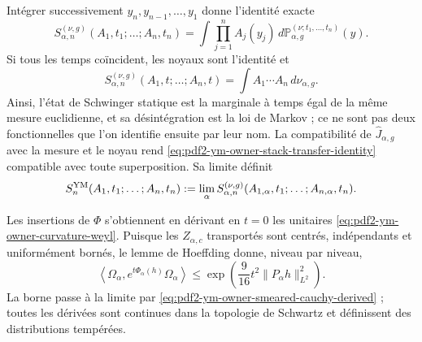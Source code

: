 Intégrer successivement $y_n,y_{n-1},\ldots,y_1$ donne l’identité exacte
\begin{equation}\label{eq:pdf2-ym-owner-stack-transfer-identity}
 S_{\alpha,n}^{(\nu,g)}(A_1,t_1;\ldots;A_n,t_n)
 =\int\prod_{j=1}^nA_j(y_j)\,
   d\mathbb P_{\alpha,g}^{(\nu;t_1,\ldots,t_n)}(y).
\end{equation}
Si tous les temps coïncident, les noyaux sont l’identité et
\begin{equation}\label{eq:pdf2-ym-owner-static-is-stack}
 S_{\alpha,n}^{(\nu,g)}(A_1,t;\ldots;A_n,t)
 =\int A_1\cdots A_n\,d\nu_{\alpha,g}.
\end{equation}
Ainsi, l'état de Schwinger statique est la marginale à temps égal de la même mesure euclidienne, et sa désintégration est la loi de Markov ; ce ne sont pas deux fonctionnelles que l'on identifie ensuite par leur nom. La compatibilité de $\widehat J_{\alpha,g}$ avec la mesure et le noyau rend \eqref{eq:pdf2-ym-owner-stack-transfer-identity} compatible avec toute superposition. Sa limite définit
\begin{equation}\label{eq:pdf2-ym-owner-schwinger-functionals}
 S_n^{\rm YM}(A_1,t_1;\ldots;A_n,t_n)
 :=\lim_{\alpha}S_{\alpha,n}^{(\nu,g)}
 (A_{1,\alpha},t_1;\ldots;A_{n,\alpha},t_n).
\end{equation}

Les insertions de $\Phi$ s’obtiennent en dérivant en $t=0$ les unitaires
\eqref{eq:pdf2-ym-owner-curvature-weyl}. Puisque les $Z_{\alpha,c}$ transportés
sont centrés, indépendants et uniformément bornés, le lemme de Hoeffding donne,
niveau par niveau,
\begin{equation}\label{eq:pdf2-ym-owner-subgaussian-bound}
 \left\langle\Omega_\alpha,
 e^{t\Phi_\alpha(h)}\Omega_\alpha\right\rangle
 \le \exp\!\left(\frac9{16}t^2\|P_\alpha h\|_{L^2}^2\right).
\end{equation}
La borne passe à la limite par
\eqref{eq:pdf2-ym-owner-smeared-cauchy-derived} ; toutes les dérivées sont continues dans
la topologie de Schwartz et définissent des distributions tempérées.

